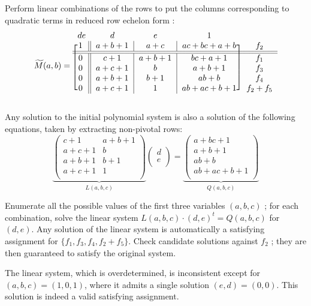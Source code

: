 \documentclass[a4paper,UKenglish,cleveref, autoref]{lipics-v2019}
\begin{document}
Perform linear combinations of the rows to put the columns corresponding to
quadratic terms in reduced row echelon form :
\[
  \widetilde M(a,b) = \begin{blockarray}{ccccc}
  de & d & e & 1 & \\
  \begin{block}{[c||c|c|c]c}
    1 & a+b+1 & a+c     & ac +bc+a+b & f_2\\
    \BAhline\BAhline
    0 & c+1 & a+b+1 & bc + a + 1 & f_1\\
    0 & a+c+1 & b & a+b+1          & f_3 \\
    0 & a+b+1 & b+1 & ab+b  & f_4 \\
    0 & a+c+1 & 1 & ab+ac +b+1 & f_2 + f_5 \\
  \end{block}
\end{blockarray}
\]


Any solution to the initial polynomial system is also a solution of the
following equations, taken by extracting non-pivotal rows:
\[
  \underbrace{\begin{pmatrix}
    c+1   & a+b+1 \\
    a+c+1 & b     \\
    a+b+1 & b+1   \\
    a+c+1 & 1     \\
  \end{pmatrix}}_{L(a,b,c)}
  \begin{pmatrix}
    d \\
    e\\
  \end{pmatrix}
  =
  \underbrace{\begin{pmatrix}
  a + bc + 1 \\       
  a + b + 1 \\  
  ab + b  \\             
  ab + ac + b + 1 \\
\end{pmatrix}}_{Q(a,b,c)}
\]

Enumerate all the possible values of the first three variables $(a, b, c)$ ; for
each combination, solve the linear system $L(a,b,c) \cdot (d,e)^t = Q(a,b,c)$
for $(d,e)$. Any solution of the linear system is automatically a satisfying
assignment for $\{f_1, f_3, f_4, f_2 + f_5\}$. Check candidate solutions against
$f_2$ ; they are then guaranteed to satisfy the original system.

The linear system, which is overdetermined, is inconsistent except for
$(a,b,c) = (1,0,1)$, where it admits a single solution $(e, d) = (0, 0)$. This
solution is indeed a valid satisfying assignment.
\end{document}
